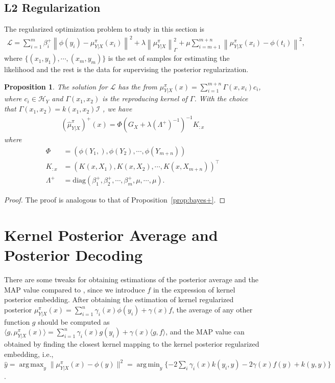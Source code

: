 \documentclass[a4paper]{article}
\newcommand{\up}{\mathrm}
\renewcommand{\cal}{\mathcal}
\newcommand{\norm}[1]{\left\lVert#1\right\rVert}
\newcommand{\T}{\intercal}
\DeclareMathOperator*{\argmin}{arg\,min}
\DeclareMathOperator*{\argmax}{arg\,max}
\newtheorem{proposition}{Proposition}
\newcommand{\propref}[1]{Proposition~\ref{#1}}
\def\muyxplus{(\widehat{\mu}_{Y|X}^\pi)^+}
\begin{document}
\subsection{L2 Regularization}
The regularized optimization problem to study in this section is
\begin{align}
\cal{L} = \sum_{i=1}^{m} \beta_i^+ \norm{\phi(y_i) - \mu_{Y|X}^\pi(x_i)}^2 + \lambda\norm{\mu_{Y|X}^\pi}_\Gamma^2 + \mu \sum_{i=m+1}^{m+n} \norm{\mu_{Y|X}^\pi(x_i) - \phi(t_i)}^2,
\end{align}
where $\{(x_1,y_1),\cdots,(x_m,y_m)\}$ is the set of samples for estimating the likelihood and the rest is the data for supervising the posterior regularization.
\begin{proposition}
The solution for $\cal{L}$ has the from $\mu_{Y|X}^\pi(x) = \sum_{i=1}^{m+n} \Gamma(x,x_i)c_i$, where $c_i \in \cal{H}_Y$ and $\Gamma(x_1,x_2)$ is the reproducing kernel of $\Gamma$. With the choice that $\Gamma(x_1,x_2) = k(x_1,x_2)\cal{I}$ , we have
\begin{align}
\muyxplus(x) = \Phi(G_X + \lambda(\Lambda^+)^{-1})^{-1}K_{:x}\label{eqn:l2reg}
\end{align}
where
\begin{align*}
\Phi &= (\phi(Y_1,),\phi(Y_2),\cdots,\phi(Y_{m+n}))\\
K_{:x} &= (K(x,X_1),K(x,X_2),\cdots,K(x,X_{m+n}))^\T\\
\Lambda^+ &= \up{diag}(\beta_1^+,\beta_2^+,\cdots,\beta_m^+,\mu,\cdots,\mu).
\end{align*}
\end{proposition}
\begin{proof}
The proof is analogous to that of \propref{prop:bayes+}.
\end{proof}
\section{Kernel Posterior Average and Posterior Decoding}
There are some tweaks for obtaining estimations of the posterior average and the MAP value compared to \cite{song2013kernel}, since we introduce $f$ in the expression of kernel posterior embedding. After obtaining the estimation of kernel regularized posterior $\mu_{Y|X}^\pi(x) = \sum_{i=1}^n \gamma_i(x) \phi(y_i) + \gamma(x) f$, the average of any other function $g$ should be computed as $\langle g, \mu_{Y|X}^\pi(x)\rangle = \sum_{i=1}^{n} \gamma_i(x)g(y_i) + \gamma(x) \langle g,f\rangle$, and the MAP value can obtained by finding the closest kernel mapping to the kernel posterior regularized embedding, i.e., $\hat{y} = \argmax_{y} \|\mu_{Y|X}^\pi(x) - \phi(y)\|^2 = \argmin_{y} \{ %
- 2\sum_i\gamma_i(x)k(y_i,y) - 2\gamma(x)f(y) + k(y,y)\}$. 
\end{document}
